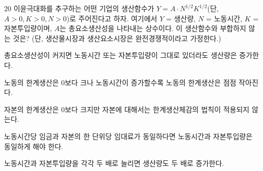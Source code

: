 \begin{question}{20}
이윤극대화를 추구하는 어떤 기업의 생산함수가 $Y=A \cdot N^{ 1/2 } K^{ 1/2 }$(단, $A>0 , K>0 , N>0$)로 주어진다고 하자. 여기에서 $Y$ = 생산량, $N$ = 노동시간, $K$ = 자본투입량이며, $A$는 총요소생산성을 나타내는 상수이다. 이 생산함수와 부합하지 않는 것은? (단, 생산물시장과 생산요소시장은 완전경쟁적이라고 가정한다.)
\begin{choices}
  \item 총요소생산성이 커지면 노동시간 또는 자본투입량이 그대로 있더라도 생산량은 증가한다.
  \item 노동의 한계생산은 0보다 크나 노동시간이 증가할수록 노동의 한계생산은 점점 작아진다.
  \item 자본의 한계생산은 0보다 크지만 자본에 대해서는 한계생산체감의 법칙이 적용되지 않는다.
  \item 노동시간당 임금과 자본의 한 단위당 임대료가 동일하다면 노동시간과 자본투입량은 동일하게 해야 한다.
  \item 노동시간과 자본투입량을 각각 두 배로 늘리면 생산량도 두 배로 증가한다.
\end{choices}
\end{question}
